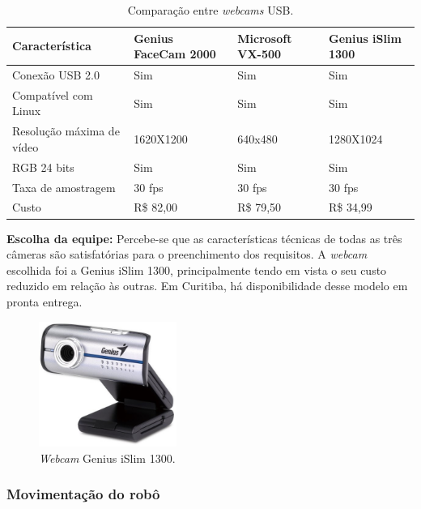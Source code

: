 \begin{table}[h]
  \caption{Comparação entre \textit{webcams} USB.}
  \centering
  \begin{tabular}{p{5cm}|p{3.3cm}p{3cm}p{2.5cm}}
    \toprule
    \textbf{Característica} & \textbf{Genius FaceCam 2000} & \multicolumn{1}{l}{\textbf{Microsoft VX-500}} & \textbf{Genius iSlim 1300}  \\
    \hline
     Conexão USB 2.0 & Sim & Sim & Sim  \\
     \hline
     Compatível com Linux & Sim & Sim & Sim \\
     \hline
     Resolução máxima de vídeo & 1620X1200 & 640x480 & 1280X1024 \\
     \hline
     RGB 24 bits & Sim & Sim & Sim \\
     \hline 
     Taxa de amostragem & 30 fps & 30 fps & 30 fps \\
     \hline
     Custo & R\$ 82,00 & R\$ 79,50 & R\$ 34,99 \\
    \bottomrule
  \end{tabular}
  \label{tab:alternativas_camera}
\end{table}

\textbf{Escolha da equipe:} Percebe-se que as características técnicas de todas as três câmeras são satisfatórias para o preenchimento dos requisitos. A \textit{webcam} escolhida foi a Genius iSlim 1300, principalmente tendo em vista o seu custo reduzido em relação às outras. Em Curitiba, há disponibilidade desse modelo em pronta entrega.

\begin{figure}[H]
\centering
\includegraphics[width=0.4\textwidth]{./figuras/genius-slim1300.jpg}
\caption{\textit{Webcam} Genius iSlim 1300.}
\label{fig:genius-islim-1300}
\end{figure}

\subsubsection{Movimentação do robô}

